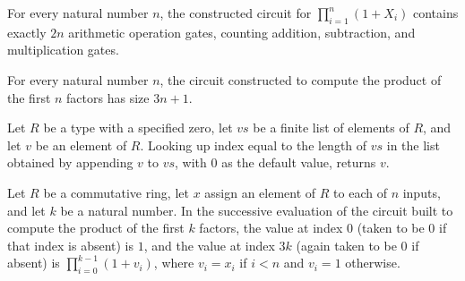 \begin{theorem}
\label{Randomized.AlgCircuit.countP_isOp_prodOnePlus}
\leanok
{}
For every natural number $n$, the constructed circuit for $\prod_{i=1}^{n}(1+X_i)$
contains exactly $2n$ arithmetic operation gates, counting addition, subtraction, and
multiplication gates.
\end{theorem}

\begin{theorem}
\label{Randomized.AlgCircuit.size_prodOnePlus}
\leanok
{}
For every natural number $n$, the circuit constructed to compute the product of the
first $n$ factors has size $3n+1$.
\end{theorem}

\begin{theorem}
\label{Randomized.AlgCircuit.getD_append_singleton_length}
\leanok
{}
Let $R$ be a type with a specified zero, let $vs$ be a finite list of elements of $R$,
and let $v$ be an element of $R$. Looking up index equal to the length of $vs$ in the
list obtained by appending $v$ to $vs$, with $0$ as the default value, returns $v$.
\end{theorem}

\begin{theorem}
\label{Randomized.AlgCircuit.run_prodOnePlusGates}
\leanok
{}
Let $R$ be a commutative ring, let $x$ assign an element of $R$ to each of $n$ inputs,
and let $k$ be a natural number. In the successive evaluation of the circuit built to
compute the product of the first $k$ factors, the value at index $0$ (taken to be $0$ if
that index is absent) is $1$, and the value at index $3k$ (again taken to be $0$ if
absent) is $\prod_{i=0}^{k-1}(1+v_i)$, where $v_i=x_i$ if $i<n$ and $v_i=1$ otherwise.
\end{theorem}

